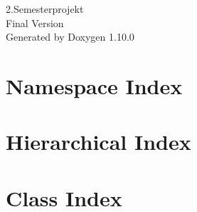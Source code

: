 \documentclass[twoside]{book}
\newcommand{\+}{\discretionary{\mbox{\scriptsize$\hookleftarrow$}}{}{}}
\newcommand{\clearemptydoublepage}{%
    \newpage{\pagestyle{empty}\cleardoublepage}%
  }
\begin{document}
  \raggedbottom
    \hypersetup{pageanchor=false,
                bookmarksnumbered=true,
                pdfencoding=unicode
               }
  \begin{titlepage}
  \vspace*{7cm}
  \begin{center}%
  {\Large 2.\+Semesterprojekt}\\
  [1ex]\large Final Version \\
  \vspace*{1cm}
  {\large Generated by Doxygen 1.10.0}\\
  \end{center}
  \end{titlepage}
  \clearemptydoublepage
  \tableofcontents
  \clearemptydoublepage
  \hypersetup{pageanchor=true}

\chapter{Namespace Index}

\chapter{Hierarchical Index}

\chapter{Class Index}

\end{document}
